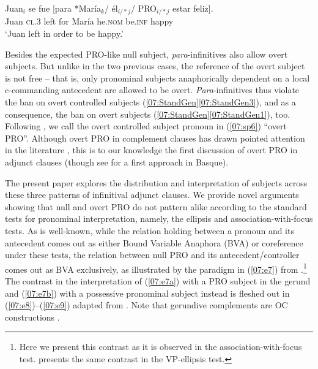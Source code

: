 \documentclass[output=paper,colorlinks,citecolor=brown,draft,draftmode]{langscibook}
\begin{document}
\begin{exe}
\ex \label{07:sp6}
\gll Juan$_i$ se fue [para *María$_k$/ él$_{i/*j}$/ PRO$_{i/*j}$ estar feliz].\\
Juan \textsc{cl.3} left for María he.\textsc{nom} {} be.\textsc{inf} happy \\
\glt ‘Juan left in order to be happy.’
\end{exe}

Besides the expected PRO-like null subject, \textit{para}-infinitives also allow overt subjects. But unlike in the two previous cases, the reference of the overt subject is not free -- that is, only pronominal subjects anaphorically dependent on a local c-commanding antecedent are allowed to be overt. \textit{Para}-infinitives thus violate the ban on overt controlled subjects (\ref{07:StandGen}\ref{07:StandGen3}), and as a consequence, the ban on overt subjects (\ref{07:StandGen}\ref{07:StandGen1}), too. Following \citet{livitz11}, we call the overt controlled subject pronoun in (\ref{07:sp6}) ``overt PRO''. Although overt PRO in complement clauses has drawn pointed attention in the literature \citep{piera87, mensching00, szabolcsi09, livitz11, livitz14}, this is to our knowledge the first discussion of overt PRO in adjunct clauses (though see \citealt{duguine13} for a first approach in Basque).

\hspace*{-4pt}The present paper explores the distribution and interpretation of subjects across these three patterns of infinitival adjunct clauses.
We provide novel arguments showing that null and overt PRO do not pattern alike according to the standard tests for pronominal interpretation, namely, the ellipsis and association-with-focus tests. As is well-known, while the relation holding between a pronoun and its antecedent comes out as either Bound Variable Anaphora (BVA) or coreference under these tests, the relation between null PRO and its antecedent/controller comes out as BVA exclusively, as illustrated by the paradigm in (\ref{07:e7}) from \citet[133--134]{fodor75}.\footnote{Here we present this contrast as it is observed in the association-with-focus test.  presents the same contrast in the VP-ellipsis test.}  The contrast in the interpretation of (\ref{07:e7a}) with a PRO subject in the gerund and (\ref{07:e7b}) with a possessive pronominal subject instead is fleshed out in (\ref{07:e8})--(\ref{07:e9}) adapted from \citet[135]{fodor75}. Note that gerundive complements are OC constructions \citep{hornstein99}.
\end{document}
